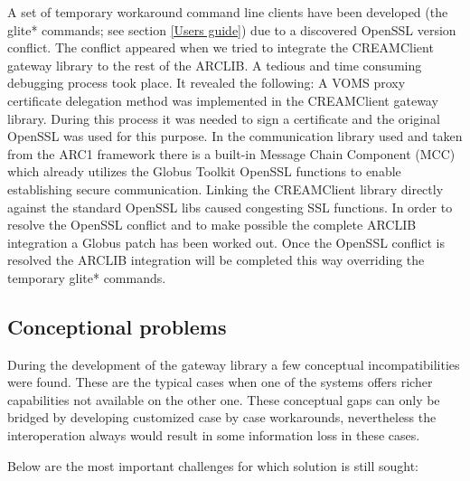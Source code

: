 \documentclass{article}
\begin{document}
A set of temporary workaround command line clients have been developed (the glite* commands; see section \ref{Users guide}) due to a discovered OpenSSL version conflict. The conflict appeared when we tried to integrate the CREAMClient gateway library to the rest of the ARCLIB. A tedious and time consuming debugging process took place. It revealed the following:  A VOMS proxy certificate delegation method was implemented in the CREAMClient gateway library. During this process it was needed to sign a certificate and the original OpenSSL was used for this purpose. In the communication library used and taken from the ARC1 framework there is a built-in Message Chain Component (MCC) which already utilizes the Globus Toolkit OpenSSL functions to enable establishing secure communication. Linking the CREAMClient library directly against the standard OpenSSL libs caused congesting SSL functions.  In order to resolve the OpenSSL conflict and to make possible the complete ARCLIB integration  a Globus patch has been worked out. Once the OpenSSL conflict is resolved the ARCLIB integration will be completed this way overriding the temporary glite* commands.\par
\subsection{Conceptional problems}
During the development of the gateway library a few conceptual incompatibilities were found. These are the typical cases when one of the systems offers richer capabilities not available on the other one. These conceptual gaps can only be bridged by developing customized case by case workarounds, nevertheless  the interoperation always would result in some information loss in these cases.\par
Below are the most important challenges for which solution is still sought:
\end{document}
